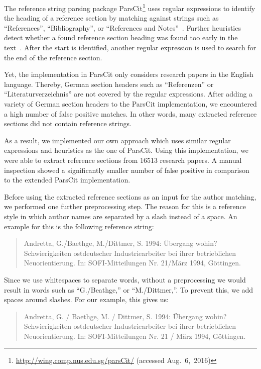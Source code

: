 The reference string parsing package ParsCit\footnote{\url{http://wing.comp.nus.edu.sg/parsCit/} (accessed Aug.~6,~2016)} uses regular expressions to identify the heading of a reference section by matching against strings such as ``References'', ``Bibliography'', or ``References and Notes''~\citep{councill2008parscit}.
Further heuristics detect whether a found reference section heading was found too early in the text~\citep{councill2008parscit}.
After the start is identified, another regular expression is used to search for the end of the reference section.

Yet, the implementation in ParsCit only considers research papers in the English language.
Thereby, German section headers such as ``Referenzen'' or ``Literaturverzeichnis'' are not covered by the regular expressions.
After adding a variety of German section headers to the ParsCit implementation, we encountered a high number of false positive matches.
In other words, many extracted reference sections did not contain reference strings.

As a result, we implemented our own approach which uses similar regular expressions and heuristics as the one of ParsCit.
Using this implementation, we were able to extract reference sections from \num{16513} research papers.
A manual inspection showed a significantly smaller number of false positive in comparison to the extended ParsCit implementation.

\bigskip

Before using the extracted reference sections as an input for the author matching, we performed one further preprocessing step.
The reason for this is a reference style in which author names are separated by a slash instead of a space.
An example for this is the following reference string:
\begin{quote}
  Andretta, G./Baethge, M./Dittmer, S. 1994: Übergang wohin? Schwierigkeiten ostdeutscher Industriearbeiter bei ihrer betrieblichen Neuorientierung. In: SOFI-Mitteilungen Nr. 21/März 1994, Göttingen.
\end{quote}
Since we use whitespaces to separate words, without a preprocessing we would result in words such as ``G./Beathge,{}'' or ``M./Dittmer,{}''.
To prevent this, we add spaces around slashes.
For our example, this gives us:
\begin{quote}
  Andretta, G. / Baethge, M. / Dittmer, S. 1994: Übergang wohin? Schwierigkeiten ostdeutscher Industriearbeiter bei ihrer betrieblichen Neuorientierung. In: SOFI-Mitteilungen Nr. 21 / März 1994, Göttingen.
\end{quote}

